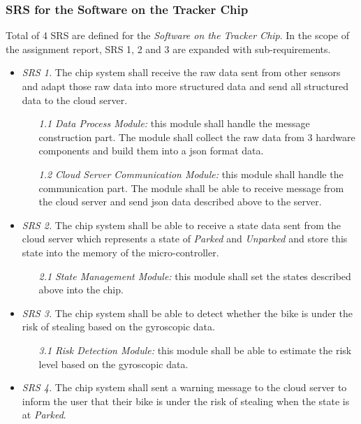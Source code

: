 \documentclass[technote, transmag, onecolumn, 9pt]{IEEEtran}
\begin{document}
\subsubsection*{\textbf{SRS for the Software on the Tracker Chip}}

Total of 4 SRS are defined for the \textit{Software on the Tracker Chip}.
In the scope of the assignment report, SRS 1, 2 and 3 are expanded with sub-requirements.

\begin{itemize}
	\item \textit{SRS 1.} The chip system shall receive the raw data sent from other sensors and adapt those raw data
	      into more structured data and send all structured data to the cloud server.
	      \begin{itemize}
		      \item [\textit{1.1}] \textit{Data Process Module:} this module shall handle the message construction part.
		            The module shall collect the raw data from 3 hardware components
		            and build them into a json format data.
		      \item [\textit{1.2}] \textit{Cloud Server Communication Module:} this module shall handle the communication part.
		            The module shall be able to receive message from the cloud server
		            and send json data described above to the server.
	      \end{itemize}

	\item \textit{SRS 2.} The chip system shall be able to receive a state data sent from the cloud server
	      which represents a state of \textit{Parked} and \textit{Unparked} and store this state into the memory of the micro-controller.
	      \begin{itemize}
		      \item [\textit{2.1}] \textit{State Management Module:} this module shall set the states described above into the chip.
	      \end{itemize}

	\item \textit{SRS 3.} The chip system shall be able to detect whether the bike is under the risk of stealing
	      based on the gyroscopic data.
	      \begin{itemize}
		      \item [\textit{3.1}] \textit{Risk Detection Module:} this module shall be able to estimate the risk level
		            based on the gyroscopic data.
	      \end{itemize}

	\item \textit{SRS 4.} The chip system shall sent a warning message to the cloud server to inform the user
	      that their bike is under the risk of stealing when the state is at \textit{Parked}.
\end{itemize}
\end{document}
